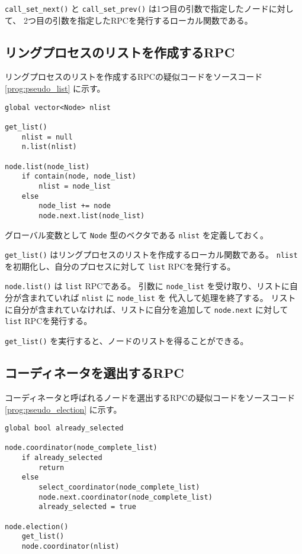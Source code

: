 \documentclass[a4paper]{jlreq}
\begin{document}
\texttt{call\_set\_next()} と \texttt{call\_set\_prev()} は1つ目の引数で指定したノードに対して、
2つ目の引数を指定したRPCを発行するローカル関数である。

\subsection{リングプロセスのリストを作成するRPC}

リングプロセスのリストを作成するRPCの疑似コードをソースコード \ref{prog:pseudo_list} に示す。

\begin{lstlisting}[label=prog:pseudo_list, caption=プロセスリストを作成するRPCの疑似コード]
global vector<Node> nlist

get_list()
    nlist = null
    n.list(nlist)

node.list(node_list)
    if contain(node, node_list)
        nlist = node_list
    else
        node_list += node
        node.next.list(node_list)
\end{lstlisting}

グローバル変数として \texttt{Node} 型のベクタである \texttt{nlist} を定義しておく。

\texttt{get\_list()} はリングプロセスのリストを作成するローカル関数である。
\texttt{nlist} を初期化し、自分のプロセスに対して \texttt{list} RPCを発行する。

\texttt{node.list()} は \texttt{list} RPCである。
引数に \texttt{node\_list} を受け取り、リストに自分が含まれていれば \texttt{nlist} に \texttt{node\_list} を
代入して処理を終了する。
リストに自分が含まれていなければ、リストに自分を追加して \texttt{node.next} に対して \texttt{list} RPCを発行する。

\texttt{get\_list()} を実行すると、ノードのリストを得ることができる。

\subsection{コーディネータを選出するRPC}

コーディネータと呼ばれるノードを選出するRPCの疑似コードをソースコード \ref{prog:pseudo_election} に示す。

\begin{lstlisting}[label=prog:pseudo_election, caption=コーディネータを選出するRPCの疑似コード]
global bool already_selected

node.coordinator(node_complete_list)
    if already_selected
        return
    else
        select_coordinator(node_complete_list)
        node.next.coordinator(node_complete_list)
        already_selected = true

node.election()
    get_list()
    node.coordinator(nlist)
\end{lstlisting}
\end{document}
